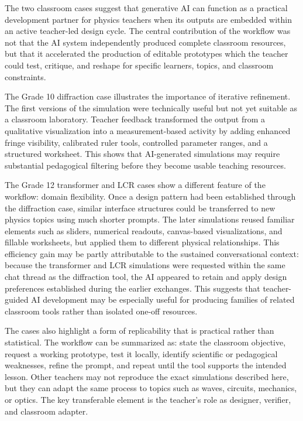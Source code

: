 \documentclass{iopjournal}
\begin{document}
The two classroom cases suggest that generative AI can function as a practical development partner for physics teachers when its outputs are embedded within an active teacher-led design cycle. The central contribution of the workflow was not that the AI system independently produced complete classroom resources, but that it accelerated the production of editable prototypes which the teacher could test, critique, and reshape for specific learners, topics, and classroom constraints.

The Grade 10 diffraction case illustrates the importance of iterative refinement. The first versions of the simulation were technically useful but not yet suitable as a classroom laboratory. Teacher feedback transformed the output from a qualitative visualization into a measurement-based activity by adding enhanced fringe visibility, calibrated ruler tools, controlled parameter ranges, and a structured worksheet. This shows that AI-generated simulations may require substantial pedagogical filtering before they become usable teaching resources.

The Grade 12 transformer and LCR cases show a different feature of the workflow: domain flexibility. Once a design pattern had been established through the diffraction case, similar interface structures could be transferred to new physics topics using much shorter prompts. The later simulations reused familiar elements such as sliders, numerical readouts, canvas-based visualizations, and fillable worksheets, but applied them to different physical relationships. This efficiency gain may be partly attributable to the sustained conversational context: because the transformer and LCR simulations were requested within the same chat thread as the diffraction tool, the AI appeared to retain and apply design preferences established during the earlier exchanges. This suggests that teacher-guided AI development may be especially useful for producing families of related classroom tools rather than isolated one-off resources.

The cases also highlight a form of replicability that is practical rather than statistical. The workflow can be summarized as: state the classroom objective, request a working prototype, test it locally, identify scientific or pedagogical weaknesses, refine the prompt, and repeat until the tool supports the intended lesson. Other teachers may not reproduce the exact simulations described here, but they can adapt the same process to topics such as waves, circuits, mechanics, or optics. The key transferable element is the teacher's role as designer, verifier, and classroom adapter.
\end{document}
